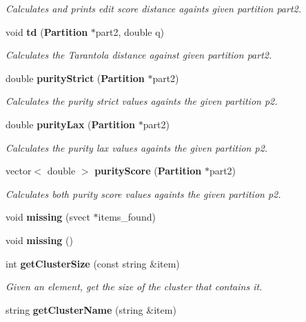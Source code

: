 \begin{CompactItemize}
\begin{CompactList}\small\item\em Calculates and prints edit score distance againts given partition part2. \item\end{CompactList}\item 
void {\bf td} ({\bf Partition} $\ast$part2, double q)\label{classPartition_a34}

\begin{CompactList}\small\item\em Calculates the Tarantola distance against given partition part2. \item\end{CompactList}\item 
double {\bf purity\-Strict} ({\bf Partition} $\ast$part2)\label{classPartition_a35}

\begin{CompactList}\small\item\em Calculates the purity strict values againts the given partition p2. \item\end{CompactList}\item 
double {\bf purity\-Lax} ({\bf Partition} $\ast$part2)\label{classPartition_a36}

\begin{CompactList}\small\item\em Calculates the purity lax values againts the given partition p2. \item\end{CompactList}\item 
vector$<$ double $>$ {\bf purity\-Score} ({\bf Partition} $\ast$part2)
\begin{CompactList}\small\item\em Calculates both purity score values againts the given partition p2. \item\end{CompactList}\item 
void {\bf missing} (svect $\ast$items\_\-found)\label{classPartition_a38}

\item 
void {\bf missing} ()\label{classPartition_a39}

\item 
int {\bf get\-Cluster\-Size} (const string \&item)\label{classPartition_a40}

\begin{CompactList}\small\item\em Given an element, get the size of the cluster that contains it. \item\end{CompactList}\item 
string {\bf get\-Cluster\-Name} (string \&item)\label{classPartition_a41}


\end{CompactItemize}
